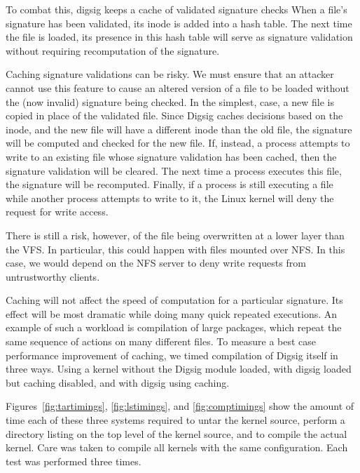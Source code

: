 \documentclass{article}
\begin{document}
To combat this, digsig keeps a cache of validated signature checks
When a file's signature has been validated, its inode is added into
a hash table.  The next time the file is loaded, its presence in
this hash table will serve as signature validation without requiring
recomputation of the signature.

Caching signature validations can be risky.  We must ensure that an
attacker cannot use this feature to cause an altered version of a file
to be loaded without the (now invalid) signature being checked.  In
the simplest, case, a new file is copied in place of the validated file.
Since Digsig caches decisions based on the inode, and the new file will
have a different
inode than the old file, the signature will be computed and checked for the
new file.  If, instead, a process attempts to write to an existing file
whose signature validation has been cached, then the signature
validation will be cleared.  The next time a process executes this file,
the signature will be recomputed.  Finally, if a process is still
executing a file while another process attempts to write to it, the
Linux kernel will deny the request for write access.

There is still a risk, however, of the file being overwritten at a lower
layer than the VFS.  In particular, this could happen with files mounted
over NFS.  In this case, we would depend on the NFS server to deny write
requests from untrustworthy clients.

Caching will not affect the speed of computation for a particular
signature.  Its effect will be most dramatic while doing many quick
repeated executions.  An example of such a workload is compilation of
large packages, which repeat the same sequence of actions on many different
files.  To measure a best case performance improvement of
caching, we timed compilation of Digsig itself in three ways.  Using a kernel
without the Digsig module loaded, with digsig loaded but caching
disabled, and with digsig using caching.

Figures~\ref{fig:tartimings}, \ref{fig:lstimings}, and \ref{fig:comptimings} show
the amount of time
each of these three systems required to untar the kernel source, perform a
directory listing on the top level of the kernel source, and to compile the
actual kernel.  Care was taken to compile all kernels with the same configuration.
Each test was performed three times.
\end{document}
